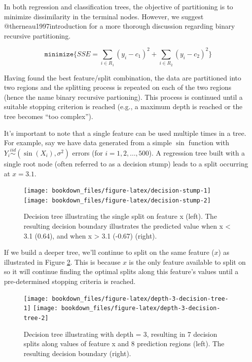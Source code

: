 \documentclass[]{krantz}
\makeatletter
\newenvironment{kframe}{%
\medskip{}
\setlength{\fboxsep}{.8em}
 \def\at@end@of@kframe{}%
 \ifinner\ifhmode%
  \def\at@end@of@kframe{\end{minipage}}%
  \begin{minipage}{\columnwidth}%
 \fi\fi%
 \def\FrameCommand##1{\hskip\@totalleftmargin \hskip-\fboxsep
 \colorbox{shadecolor}{##1}\hskip-\fboxsep
     \hskip-\linewidth \hskip-\@totalleftmargin \hskip\columnwidth}%
 \MakeFramed {\advance\hsize-\width
   \@totalleftmargin\z@ \linewidth\hsize
   \@setminipage}}%
 {\par\unskip\endMakeFramed%
 \at@end@of@kframe}
\newenvironment{block}[1]
  {
  \begin{itemize}
  \renewcommand{\labelitemi}{
    \raisebox{-.7\height}[0pt][0pt]{
      {\setkeys{Gin}{width=3em,keepaspectratio}\texttt{[image: icons/\#1]}}
    }
  }
  \setlength{\fboxsep}{1em}
  \begin{kframe}
  \item
  }
  {
  \end{kframe}
  \end{itemize}
  }
\newenvironment{note}
  {\begin{block}{note}}
  {\end{block}}
\makeatother
\begin{document}
\begin{note}
In both regression and classification trees, the objective of
partitioning is to minimize dissimilarity in the terminal nodes.
However, we suggest @therneau1997introduction for a more thorough
discussion regarding binary recursive partitioning.
\end{note}

\begin{equation}
\label{eq:partobjective}
\texttt{minimize} \bigg\{ SSE = \sum_{i \in R_1}(y_i - c_1)^2 + \sum_{i \in R_2}(y_i - c_2)^2 \bigg\}
\end{equation}

Having found the best feature/split combination, the data are partitioned into two regions and the splitting process is repeated on each of the two regions (hence the name binary recursive partioning). This process is continued until a suitable stopping criterion is reached (e.g., a maximum depth is reached or the tree becomes ``too complex'').

It's important to note that a single feature can be used multiple times in a tree. For example, say we have data generated from a simple \(\sin\) function with \(Y_i \stackrel{iid}{\sim} \left(\sin\left(X_i\right), \sigma^2\right)\) errors (for \(i = 1, 2, \dots, 500\)). A regression tree built with a single root node (often referred to as a decision stump) leads to a split occurring at \(x = 3.1\).

\begin{figure}

{\centering \texttt{[image: bookdown\_files/figure-latex/decision-stump-1]} \texttt{[image: bookdown\_files/figure-latex/decision-stump-2]} 

}

\caption{Decision tree illustrating the single split on feature x (left). The resulting decision boundary illustrates the predicted value when x < 3.1 (0.64), and when x > 3.1 (-0.67) (right).}\label{fig:decision-stump}
\end{figure}

If we build a deeper tree, we'll continue to split on the same feature (\(x\)) as illustrated in Figure \ref{fig:depth-3-decision-tree}. This is because \(x\) is the only feature available to split on so it will continue finding the optimal splits along this feature's values until a pre-determined stopping criteria is reached.

\begin{figure}

{\centering \texttt{[image: bookdown\_files/figure-latex/depth-3-decision-tree-1]} \texttt{[image: bookdown\_files/figure-latex/depth-3-decision-tree-2]} 

}

\caption{Decision tree illustrating with depth = 3, resulting in 7 decision splits along values of feature x and 8 prediction regions (left). The resulting decision boundary (right).}\label{fig:depth-3-decision-tree}
\end{figure}
\end{document}
